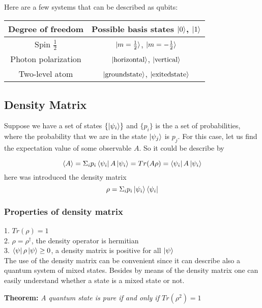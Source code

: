 \documentclass[english,14pt,a4paper]{article}
\begin{document}
\begin{spacing}{1.5}
	Here are a few systems that can be described as qubits: 
	\begin{table}[h]
		\centering
		\begin{tabular}{|c|c|} 
			\hline
			Degree of freedom & Possible basis states $\ket{0}$, $\ket{1} $\\ 
			\hline
			Spin $\frac12$  & $\ket{m = \frac12}$, $\ket{m = - \frac12}	$  \\ 
			
			Photon polarization & $\ket{\text{horizontal}}$, $\ket{\text{vertical}}$ \\
			
			Two-level atom & $\ket{\text{groundstate}}$, $\ket{\text{exitedstate}}$ \\ 
			\hline
		\end{tabular}
	\end{table}
	
	
	\subsection{Density Matrix}
	Suppose we have a set of states $\{\ket{\psi_i}\}$ and $\{p_i\}$ is the a set of probabilities, where the probability that we are in the state $\ket{\psi_j}$ is $p_j$. For this case, let us find the expectation value of some observable $A$. So it could be describe by 
	
	\[
	\left\langle A \right\rangle = \Sigma_i p_i \bra{\psi _i} A \ket{\psi_i} = Tr(A \rho) = \bra{\psi_i} A \ket{\psi_i}
	\]
	here was introduced the density matrix 
	\[
	\rho = \Sigma_i p_i \ket{\psi_i} \bra{\psi_i}
	\]
	\subsubsection{Properties of density matrix} 
	1. $Tr(\rho) = 1$ \\
	2. $\rho = \rho^{\dag}$, the density operator is hermitian \\
	3. $\bra{\psi}\rho\ket{\psi} \geq 0  $, a density matrix is positive for all $\ket{\psi}$ \\
	The use of the density matrix can be convenient since it can describe also a quantum system of mixed states. Besides by means of the density matrix one can easily understand whether a state is a mixed state or not. 
	
	\textbf{Theorem:} \textit{A quantum state is pure if and only if $Tr(\rho^2) = 1$} \\
	

\end{spacing}
\end{document}
